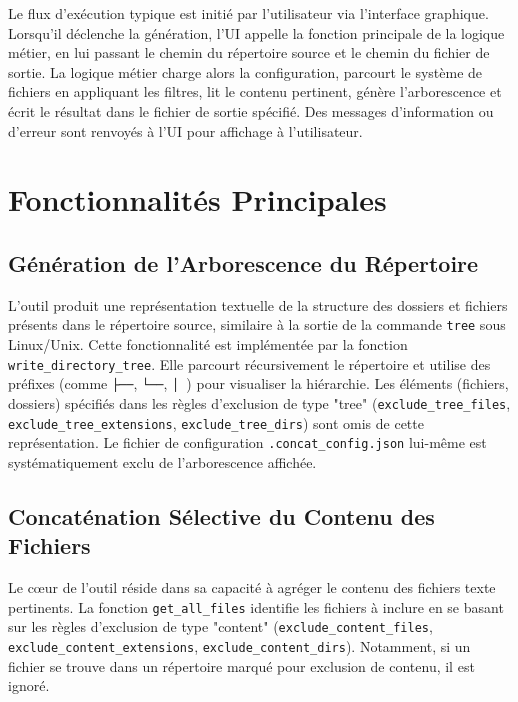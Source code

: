 \documentclass[11pt, a4paper]{article}
\begin{document}
Le flux d'exécution typique est initié par l'utilisateur via l'interface graphique. Lorsqu'il déclenche la génération, l'UI appelle la fonction principale de la logique métier, en lui passant le chemin du répertoire source et le chemin du fichier de sortie. La logique métier charge alors la configuration, parcourt le système de fichiers en appliquant les filtres, lit le contenu pertinent, génère l'arborescence et écrit le résultat dans le fichier de sortie spécifié. Des messages d'information ou d'erreur sont renvoyés à l'UI pour affichage à l'utilisateur.

\section{Fonctionnalités Principales}

\subsection{Génération de l'Arborescence du Répertoire}
L'outil produit une représentation textuelle de la structure des dossiers et fichiers présents dans le répertoire source, similaire à la sortie de la commande \texttt{tree} sous Linux/Unix. Cette fonctionnalité est implémentée par la fonction \texttt{write\_directory\_tree}. Elle parcourt récursivement le répertoire et utilise des préfixes (comme \texttt{├──}, \texttt{└──}, \texttt{│   }) pour visualiser la hiérarchie. Les éléments (fichiers, dossiers) spécifiés dans les règles d'exclusion de type "tree" (\texttt{exclude\_tree\_files}, \texttt{exclude\_tree\_extensions}, \texttt{exclude\_tree\_dirs}) sont omis de cette représentation. Le fichier de configuration \texttt{.concat\_config.json} lui-même est systématiquement exclu de l'arborescence affichée.

\subsection{Concaténation Sélective du Contenu des Fichiers}
Le cœur de l'outil réside dans sa capacité à agréger le contenu des fichiers texte pertinents. La fonction \texttt{get\_all\_files} identifie les fichiers à inclure en se basant sur les règles d'exclusion de type "content" (\texttt{exclude\_content\_files}, \texttt{exclude\_content\_extensions}, \texttt{exclude\_content\_dirs}). Notamment, si un fichier se trouve dans un répertoire marqué pour exclusion de contenu, il est ignoré.
\end{document}
